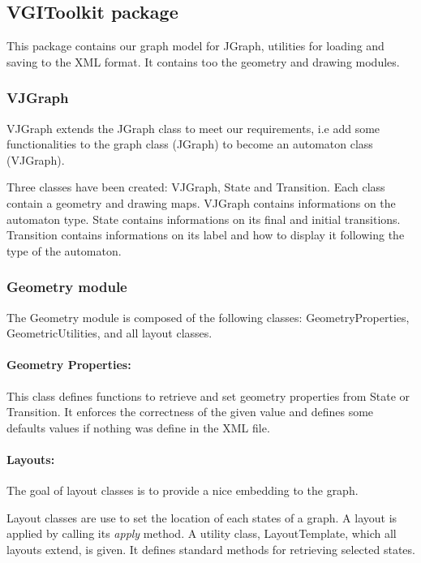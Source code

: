 \subsection[src/vgitoolkit/vaucanson/vgitoolkit]{VGIToolkit package}

This package contains our graph model for JGraph, utilities for
loading and saving to the XML format. It contains too the geometry and
drawing modules.

\subsubsection{VJGraph}

VJGraph extends the JGraph class to meet our requirements, i.e add
some functionalities to the graph class (JGraph) to become an
automaton class (VJGraph).

Three classes have been created: VJGraph, State and Transition.
Each class contain a geometry and drawing maps.
VJGraph contains informations on the automaton type.
State contains informations on its final and initial transitions.
Transition contains informations on its label and how to display it
following the type of the automaton.

\subsubsection{Geometry module}

The Geometry module is composed of the following classes:
GeometryProperties, GeometricUtilities, and all layout classes.

\paragraph{Geometry Properties:}

This class defines functions to retrieve and set geometry properties
from State or Transition. It enforces the correctness of the given
value and defines some defaults values if nothing was define in the
XML file.

\paragraph{Layouts:}

The goal of layout classes is to provide a nice embedding to the graph.

Layout classes are use to set the location of each states of a
graph. A layout is applied by calling its \emph{apply} method. A
utility class, LayoutTemplate, which all layouts extend, is given. It
defines standard methods for retrieving selected states.

